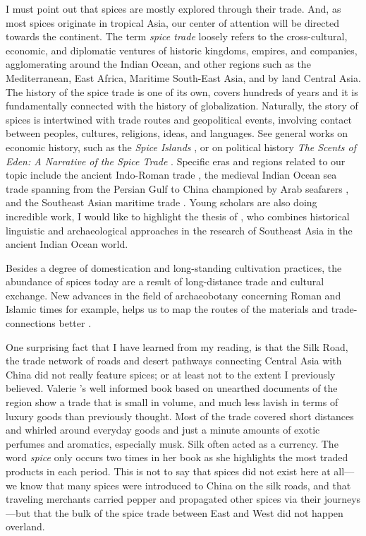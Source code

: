I must point out that spices are mostly explored through their trade. And, as most spices originate in tropical Asia, our center of attention will be directed towards the continent. The term \textit{spice trade} loosely refers to the cross-cultural, economic, and diplomatic ventures of historic kingdoms, empires, and companies, agglomerating around the Indian Ocean, and other regions such as the Mediterranean, East Africa, Maritime South-East Asia, and by land Central Asia. The history of the spice trade is one of its own, covers hundreds of years and it is fundamentally connected with the history of globalization. Naturally, the story of spices is intertwined with trade routes and geopolitical events, involving contact between peoples, cultures, religions, ideas, and languages. See general works on economic history, such as the \textit{Spice Islands} \autocite{burnet_spice_2011}, or on political history \textit{The Scents of Eden: A Narrative of the Spice Trade} \autocite{corn_scents_1998}. Specific eras and regions related to our topic include the ancient Indo-Roman trade \autocite{sidebotham_berenike_2011,cobb_indian_2019}, the medieval Indian Ocean sea trade spanning from the Persian Gulf to China championed by Arab seafarers \autocite{hourani_arab_1975, pearson_spices_1996}, and the Southeast Asian maritime trade \autocite{donkin_between_2003,hall_history_2010,reid_southeast_1988}. Young scholars are also doing incredible work, I would like to highlight the thesis of \textcite{hoogervorst_southeast_2012}, who combines historical linguistic and archaeological approaches in the research of Southeast Asia in the ancient Indian Ocean world.

Besides a degree of domestication and long-standing cultivation practices, the abundance of spices today are a result of long-distance trade and cultural exchange. New advances in the field of archaeobotany concerning Roman and Islamic times for example, helps us to map the routes of the materials and trade-connections better \autocites[see][]{van_der_veen_roman_2015}{ van_der_veen_archaeobotany_2018}.

One surprising fact that I have learned from my reading, is that the Silk Road, the trade network of roads and desert pathways connecting Central Asia with China did not really feature spices; or at least not to the extent I previously believed. Valerie \textcite{hansen_silk_2012}'s well informed book based on unearthed documents of the region show a trade that is small in volume, and much less lavish in terms of luxury goods than previously thought. Most of the trade covered short distances and whirled around everyday goods and just a minute amounts of exotic perfumes and aromatics, especially musk. Silk often acted as a currency. The word \textit{spice} only occurs two times in her book as she highlights the most traded products in each period. This is not to say that spices did not exist here at all---we know that many spices were introduced to China on the silk roads, and that traveling merchants carried pepper and propagated other spices via their journeys---but that the bulk of the spice trade between East and West did not happen overland.

